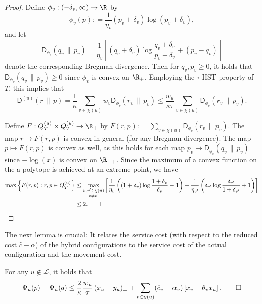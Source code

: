 \documentclass{toc}
\newcommand{\calL}{\mathcal L}
\newcommand{\dmid}{\,\|\,}
\newcommand{\seteq}{\mathrel{\mathop:}=}
\newcommand{\sfD}{\mathsf D}
\begin{document}
\begin{proof}
	Define $\phi_v : (-\delta_v,\infty) \to \R$ by
	\[
	\phi_v(p) \seteq \frac{1}{\eta_v} (p_v+\delta_v) \log (p_v+\delta_v),
	\]
	and let
	\[
	\sfD_{\phi_v}(q_v \dmid p_v) = \frac{1}{\eta_v} \left[(q_v+\delta_v) \log \frac{q_v+\delta_v}{p_v+\delta_v} + (p_v-q_v)\right]
	\]
	denote the corresponding Bregman divergence.
	Then for $q_v,p_v \geq 0$, it holds that $\sfD_{\phi_v}(q_v \dmid p_v) \geq 0$ since $\phi_v$ is convex on $\R_+$.
	Employing the $\tau$-HST property of $T$, this implies that
	\[
	\sfD^{(u)}(r \dmid p) = \frac{1}{\kappa} \sum_{v \in \chi(u)} w_v \sfD_{\phi_v}(r_v \dmid p_v) \leq
	\frac{w_u}{\kappa \tau} \sum_{v \in \chi(u)} \sfD_{\phi_v}(r_v \dmid p_v).
	\]
	
	Define $F : Q^{(u)}_T \times Q^{(u)}_T \to \R_+$ by $F(r,p) \seteq\sum_{v \in \chi(u)} \sfD_{\phi_v}(r_v \dmid p_v)$.
	The map $r \mapsto F(r,p)$ is convex in general (for any Bregman divergence).
	The map $p \mapsto F(r,p)$ is convex as well, as this holds for each map $p_v \mapsto \sfD_{\phi_v}(q_v \dmid p_v)$
	since $-\log(x)$ is convex on $\R_{++}$.
	Since the maximum of a convex function on the a polytope is achieved at an extreme point, we have
	\begin{align*}
	\max \left\{ F(r,p) :r,p \in Q^{(u)}_T \right\} &\leq \max_{\substack{v,v' \in \chi(u) \\ v \neq v'}} 
	\left[
	\frac{1}{\eta_v} \left((1+\delta_v) \log \frac{1+\delta_v}{\delta_v} -1\right)
	+ \frac{1}{\eta_{v'}} \left(\delta_{v'} \log \frac{\delta_{v'}}{1+\delta_{v'}} +1\right)\right]
	\\
	&\leq 2.\qedhere
	\end{align*}
\end{proof}

The next lemma is crucial: It relates the service cost (with respect to the reduced cost $\hat{c}-\alpha$) of the hybrid configurations to the service cost of the actual configuration and the movement cost.
\begin{lemma}
   \label{lem:crucial}
	For any $u \notin \calL$, it holds that
	\begin{equation}\label{eq:hybrid}
	\Psi_u(p) - \Psi_u(q) \leq \frac{2}{\kappa} \frac{w_u}{\tau} \left(x_u-y_u\right)_+ + 
	\sum_{v \in \chi(u)} (\hat{c}_v-\alpha_v) \left[x_v - \theta_v x_u\right].\qedhere
	\end{equation}
\end{lemma}
\end{document}
